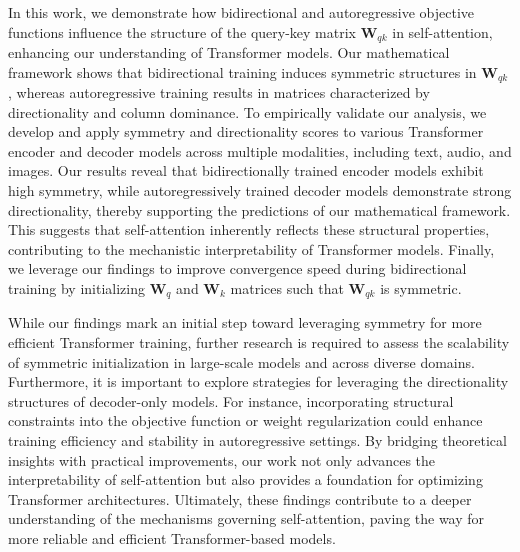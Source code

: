 %
In this work, we demonstrate how bidirectional and autoregressive objective functions influence the structure of the query-key matrix $\bm{W}_{qk}$ in self-attention, enhancing our understanding of Transformer models.
%
Our mathematical framework shows that bidirectional training induces symmetric structures in $\bm{W}_{qk}$, whereas autoregressive training results in matrices characterized by directionality and column dominance.
%
To empirically validate our analysis, we develop and apply symmetry and directionality scores to various Transformer encoder and decoder models across multiple modalities, including text, audio, and images. 
%
Our results reveal that bidirectionally trained encoder models exhibit high symmetry, while autoregressively trained decoder models demonstrate strong directionality, thereby supporting the predictions of our mathematical framework.
%
%
This suggests that self-attention inherently reflects these structural properties, contributing to the mechanistic interpretability of Transformer models.
%
%
Finally, we leverage our findings to improve convergence speed during bidirectional training by initializing $\bm{W}_q$ and  $\bm{W}_k$ matrices such that $\bm{W}_{qk}$ is symmetric.
%
%

While our findings mark an initial step toward leveraging symmetry for more efficient Transformer training, further research is required to assess the scalability of symmetric initialization in large-scale models and across diverse domains.
%
%
Furthermore, it is important to explore strategies for leveraging the directionality structures of decoder-only models.
%
For instance, incorporating structural constraints into the objective function or weight regularization could enhance training efficiency and stability in autoregressive settings.
%
By bridging theoretical insights with practical improvements, our work not only advances the interpretability of self-attention but also provides a foundation for optimizing Transformer architectures.
%
Ultimately, these findings contribute to a deeper understanding of the mechanisms governing self-attention, paving the way for more reliable and efficient Transformer-based models.
